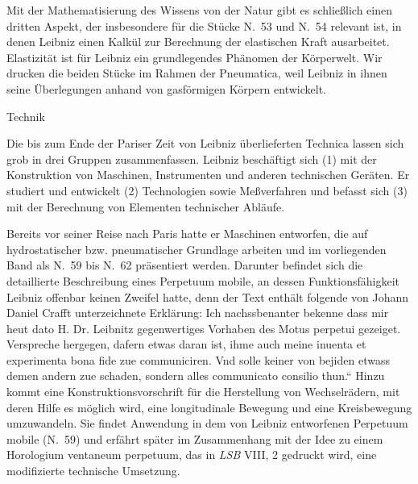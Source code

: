 Mit der Mathematisierung des Wissens von der Natur gibt es schlie{\ss}lich einen dritten Aspekt, der insbesondere f\"{u}r die St\"{u}cke N.~53 und N.~54 relevant ist, in denen Leibniz einen Kalk\"{u}l zur Berechnung der elastischen Kraft ausarbeitet. Elastizit\"{a}t ist f\"{u}r Leibniz ein grundlegendes Ph\"{a}nomen der K\"{o}rperwelt. Wir dru\-cken die beiden St\"{u}cke im Rahmen der Pneumatica, weil Leibniz in ihnen seine \"{U}berlegungen anhand von gasf\"{o}rmigen K\"{o}rpern entwickelt.\par\vspace{2.0ex}

Technik\par\vspace{1.0ex}

Die bis zum Ende der Pariser Zeit von Leibniz \"{u}berlieferten Technica lassen sich grob in drei Gruppen zusammenfassen. Leibniz besch\"{a}ftigt sich (1) mit der Konstruktion von Maschinen, Instrumenten und anderen technischen Ger\"{a}ten. Er studiert und entwickelt (2) Technologien sowie Me{\ss}verfahren und befasst sich (3) mit der Berechnung von Elementen technischer Abl\"{a}ufe.\par
Bereits vor seiner Reise nach Paris hatte er Maschinen entworfen, die auf hydrostatischer bzw. pneumatischer Grundlage arbeiten und im vorliegenden Band als N.~59 bis N.~62 pr\"{a}sentiert werden. Darunter befindet sich die detaillierte Beschreibung eines Perpetuum mobile, an dessen Funktionsf\"{a}higkeit Leibniz offenbar keinen Zweifel hatte, denn der Text enth\"{a}lt folgende von Johann Daniel Crafft unterzeichnete Erkl\"{a}rung: \glqq Ich nachssbenanter bekenne dass mir heut dato H. Dr. Leibnitz gegenwertiges Vorhaben des Motus perpetui gezeiget. Verspreche hergegen, dafern etwas daran ist, ihme auch meine inuenta et experimenta bona fide zue communiciren. Vnd solle keiner von bejiden etwass demen andern zue schaden, sondern alles communicato consilio thun.`` Hinzu kommt eine Konstruktionsvorschrift f\"{u}r die Herstellung von Wechselr\"{a}dern, mit deren Hilfe es m\"{o}glich wird, eine longitudinale Bewegung und eine Kreisbewegung umzuwandeln. Sie findet Anwendung in dem von Leibniz entworfenen Perpetuum mobile (N.~59) und erf\"{a}hrt sp\"{a}ter im Zusammenhang mit der Idee zu einem Horologium ventaneum perpetuum, das in \textit{LSB} VIII, 2 gedruckt wird, eine modifizierte technische Umsetzung.\par
